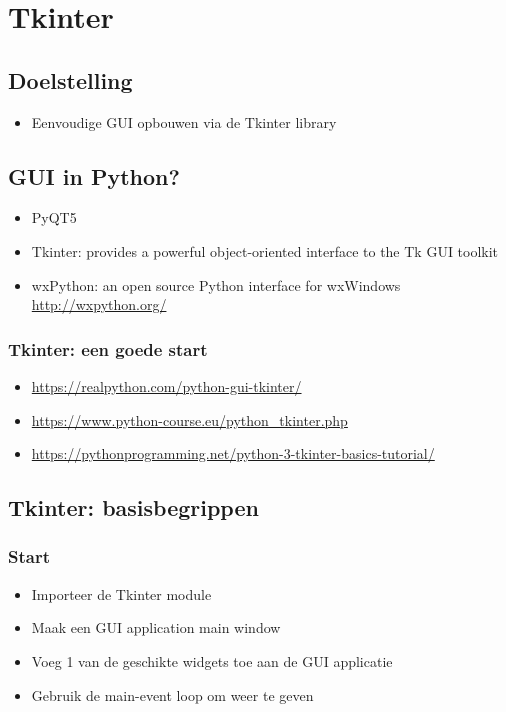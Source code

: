 \documentclass{article}
\begin{document}
\section{Tkinter}

\subsection{Doelstelling}

\begin{itemize}
    \item Eenvoudige GUI opbouwen via de Tkinter library
\end{itemize}

\subsection{GUI in Python?}

\begin{itemize}
    \item PyQT5
    \item Tkinter: provides a powerful object-oriented interface to the Tk GUI toolkit
    \item wxPython: an open source Python interface for wxWindows \url{http://wxpython.org/}
\end{itemize}

\subsubsection{Tkinter: een goede start}

\begin{itemize}
    \item \url{https://realpython.com/python-gui-tkinter/}
    \item \url{https://www.python-course.eu/python_tkinter.php}
    \item \url{https://pythonprogramming.net/python-3-tkinter-basics-tutorial/}
\end{itemize}

\subsection{Tkinter: basisbegrippen}

\subsubsection{Start}

\begin{itemize}
    \item Importeer de Tkinter module
    \item Maak een GUI application main window
    \item Voeg 1 van de geschikte widgets toe aan de GUI applicatie
    \item Gebruik de main-event loop om weer te geven
\end{itemize}
\end{document}
